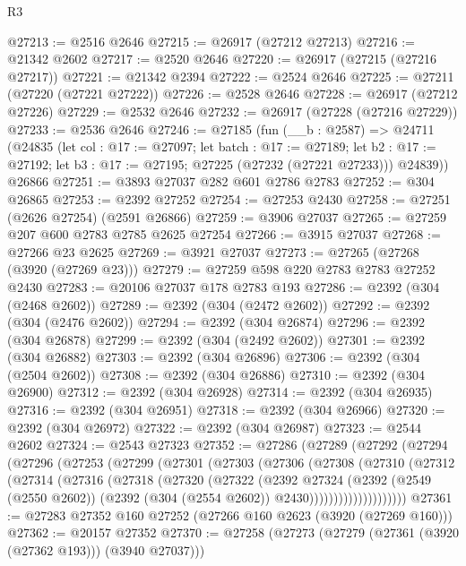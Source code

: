 \begin{lexlean}{R3}
\begin{coremodule}
@27213 := @2516 @2646
@27215 := @26917 (@27212 @27213)
@27216 := @21342 @2602
@27217 := @2520 @2646
@27220 := @26917 (@27215 (@27216 @27217))
@27221 := @21342 @2394
@27222 := @2524 @2646
@27225 := @27211 (@27220 (@27221 @27222))
@27226 := @2528 @2646
@27228 := @26917 (@27212 @27226)
@27229 := @2532 @2646
@27232 := @26917 (@27228 (@27216 @27229))
@27233 := @2536 @2646
@27246 := @27185
    (fun (__b : @2587) =>
    @24711
      (@24835
        (let col : @17 := @27097;
        let batch : @17 := @27189;
        let b2 : @17 := @27192; let b3 : @17 := @27195; @27225 (@27232 (@27221 @27233)))
        @24839))
    @26866
@27251 := @3893 @27037 @282 @601 @2786 @2783
@27252 := @304 @26865
@27253 := @2392 @27252
@27254 := @27253 @2430
@27258 := @27251 (@2626 @27254) (@2591 @26866)
@27259 := @3906 @27037
@27265 := @27259 @207 @600 @2783 @2785 @2625 @27254
@27266 := @3915 @27037
@27268 := @27266 @23 @2625
@27269 := @3921 @27037
@27273 := @27265 (@27268 (@3920 (@27269 @23)))
@27279 := @27259 @598 @220 @2783 @2783 @27252 @2430
@27283 := @20106 @27037 @178 @2783 @193
@27286 := @2392 (@304 (@2468 @2602))
@27289 := @2392 (@304 (@2472 @2602))
@27292 := @2392 (@304 (@2476 @2602))
@27294 := @2392 (@304 @26874)
@27296 := @2392 (@304 @26878)
@27299 := @2392 (@304 (@2492 @2602))
@27301 := @2392 (@304 @26882)
@27303 := @2392 (@304 @26896)
@27306 := @2392 (@304 (@2504 @2602))
@27308 := @2392 (@304 @26886)
@27310 := @2392 (@304 @26900)
@27312 := @2392 (@304 @26928)
@27314 := @2392 (@304 @26935)
@27316 := @2392 (@304 @26951)
@27318 := @2392 (@304 @26966)
@27320 := @2392 (@304 @26972)
@27322 := @2392 (@304 @26987)
@27323 := @2544 @2602
@27324 := @2543 @27323
@27352 := @27286
    (@27289
      (@27292
        (@27294
          (@27296
            (@27253
              (@27299
                (@27301
                  (@27303
                    (@27306
                      (@27308
                        (@27310
                          (@27312
                            (@27314
                              (@27316
                                (@27318
                                  (@27320
                                    (@27322
                                      (@2392
                                        @27324
                                        (@2392
                                          (@2549 (@2550 @2602))
                                          (@2392 (@304 (@2554 @2602)) @2430))))))))))))))))))))
@27361 := @27283 @27352 @160 @27252 (@27266 @160 @2623 (@3920 (@27269 @160)))
@27362 := @20157 @27352
@27370 := @27258 (@27273 (@27279 (@27361 (@3920 (@27362 @193))) (@3940 @27037)))

\end{coremodule}
\end{lexlean}
